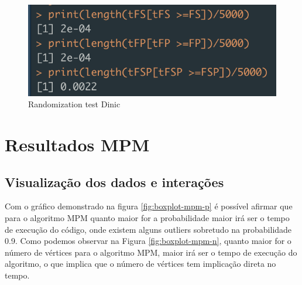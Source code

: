 \documentclass{uofa-eng-assignment}
\begin{document}
\begin{figure}[h]
    \centering
    \includegraphics[width=0.5\linewidth]{rand_test_dinic.png}
    \caption{Randomization test Dinic}
    \label{fig:randtest-dinic}
\end{figure}


\section{Resultados MPM}

\subsection{Visualização dos dados e interações}

Com o gráfico demonstrado na figura \ref{fig:boxplot-mpm-p} é possível afirmar que para o algoritmo MPM quanto maior for a probabilidade maior irá ser o tempo de execução do código, onde existem alguns outliers sobretudo na probabilidade 0.9.
Como podemos observar na Figura \ref{fig:boxplot-mpm-n}, quanto maior for o número de vértices para o algoritmo MPM, maior irá ser o tempo de execução do algoritmo, o que implica que o número de vértices tem implicação direta no tempo.
\end{document}
